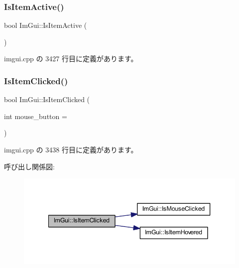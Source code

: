 \subsubsection{\texorpdfstring{Is\+Item\+Active()}{IsItemActive()}}
{\footnotesize\ttfamily bool Im\+Gui\+::\+Is\+Item\+Active (\begin{DoxyParamCaption}{ }\end{DoxyParamCaption})}



 imgui.\+cpp の 3427 行目に定義があります。

\mbox{\label{namespace_im_gui_a0b5780dbd580e28f5d31f39da80b0b01}} 
\subsubsection{\texorpdfstring{Is\+Item\+Clicked()}{IsItemClicked()}}
{\footnotesize\ttfamily bool Im\+Gui\+::\+Is\+Item\+Clicked (\begin{DoxyParamCaption}\item[{int}]{mouse\+\_\+button = {} }\end{DoxyParamCaption})}



 imgui.\+cpp の 3438 行目に定義があります。

呼び出し関係図\+:\nopagebreak
\begin{figure}[H]
\begin{center}
\leavevmode
\includegraphics[width=340pt]{namespace_im_gui_a0b5780dbd580e28f5d31f39da80b0b01_cgraph}
\end{center}
\end{figure}
\mbox{\label{namespace_im_gui_ac9a400eff3a9561d95e80486c52a660b}} 
